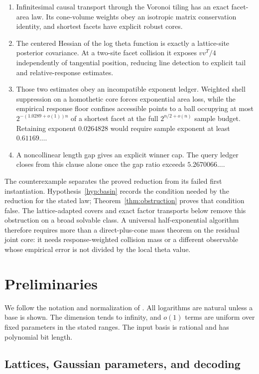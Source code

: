 \documentclass[10pt]{article}
\theoremstyle{definition}
\begin{document}
\begin{enumerate}[leftmargin=2em]
used simplex-cancellation family is polynomial-time solvable.
\item Infinitesimal causal transport through the Voronoi tiling has an exact
facet-area law.  Its cone-volume weights obey an isotropic matrix
conservation identity, and shortest facets have explicit robust cores.
\item The centered Hessian of the log theta function is exactly a lattice-site
posterior covariance.  At a two-site facet collision it exposes $vv^T/4$
independently of tangential position, reducing line detection to explicit
tail and relative-response estimates.
\item Those two estimates obey an incompatible exponent ledger.  Weighted
shell suppression on a homothetic core forces exponential area loss, while
the empirical response floor confines accessible points to a ball occupying
at most $2^{-(1.0289+o(1))n}$ of a shortest facet at the full
$2^{n/2+o(n)}$ sample budget.  Retaining exponent $0.0264828$ would require
sample exponent at least $0.61169\ldots$.
\item A noncollinear length gap gives an explicit winner cap.  The query
ledger closes from this clause alone once the gap ratio exceeds
$5.2670066\ldots$.
\end{enumerate}

The counterexample separates the proved reduction from its failed first
instantiation.  Hypothesis~\ref{hyp:basin} records the condition needed by
the reduction for the stated law; Theorem~\ref{thm:obstruction} proves that
condition false.  The lattice-adapted covers and exact factor transports
below remove this obstruction on a broad solvable class.  A universal
half-exponential algorithm therefore requires more than a direct-plus-cone
mass theorem on the residual joint core: it needs response-weighted collision
mass or a different observable whose empirical error is not divided by the
local theta value.

\section{Preliminaries}

We follow the notation and normalization of \cite{Hhan26}.  All logarithms
are natural unless a base is shown.  The dimension tends to infinity, and
$o(1)$ terms are uniform over fixed parameters in the stated ranges.  The
input basis is rational and has polynomial bit length.

\subsection{Lattices, Gaussian parameters, and decoding}
\end{document}

